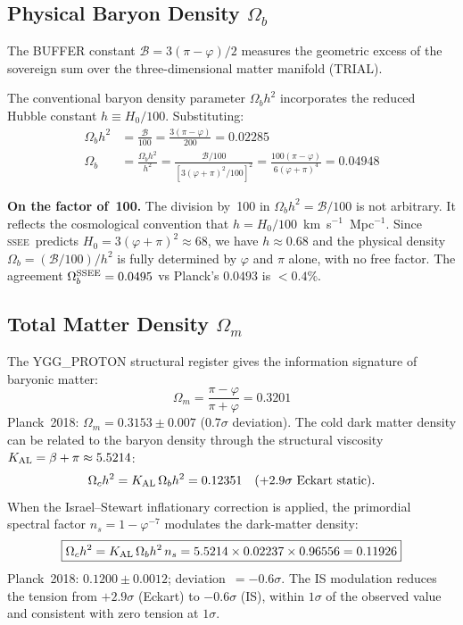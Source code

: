 \documentclass[12pt,a4paper]{article}
\newcommand{\SSEE}{\ifmmode\mathrm{SSEE}\else\textsc{ssee}\fi}
\begin{document}
\subsection{Physical Baryon Density \texorpdfstring{$\Omega_b$}{Omega\_b}}
\label{sec:baryons}

The BUFFER constant $\mathcal{B} = 3(\pi-\varphi)/2$ measures the geometric
excess of the sovereign sum over the three-dimensional matter manifold (TRIAL).

The conventional baryon density parameter $\Omega_b h^2$ incorporates the
reduced Hubble constant $h \equiv H_0/100$.  Substituting:
\begin{align}
\Omega_b h^2 &= \frac{\mathcal{B}}{100} = \frac{3(\pi-\varphi)}{200} = 0.02285 \\[4pt]
\Omega_b     &= \frac{\Omega_b h^2}{h^2}
              = \frac{\mathcal{B}/100}{[3(\varphi+\pi)^2/100]^2}
              = \frac{100(\pi-\varphi)}{6(\varphi+\pi)^4}
              = 0.04948
\label{eq:Ob}
\end{align}

\textbf{On the factor of~100.}
The division by~100 in $\Omega_b h^2 = \mathcal{B}/100$ is not arbitrary.
It reflects the cosmological convention that $h = H_0/100$~km~s$^{-1}$~Mpc$^{-1}$.
Since \SSEE\ predicts $H_0 = 3(\varphi+\pi)^2 \approx 68$, we have $h \approx 0.68$
and the physical density $\Omega_b = (\mathcal{B}/100)/h^2$ is fully determined by
$\varphi$ and $\pi$ alone, with no free factor.
The agreement $\Omega_b^{\rm SSEE} = 0.0495$ vs Planck's $0.0493$ is $<0.4\%$.

\subsection{Total Matter Density \texorpdfstring{$\Omega_m$}{Omega\_m}}
\label{sec:matter}

The YGG\_PROTON structural register gives the information signature of baryonic matter:
\begin{equation}
\Omega_m = \frac{\pi-\varphi}{\pi+\varphi} = 0.3201
\end{equation}
Planck~2018: $\Omega_m = 0.3153\pm0.007$ ($0.7\sigma$ deviation).
The cold dark matter density can be related to the baryon density through the
structural viscosity $K_{\rm AL} = \beta + \pi \approx 5.5214$:
\begin{equation}
\Omega_c h^2 = K_{\rm AL}\,\Omega_b h^2 = 0.12351 \quad (+2.9\sigma\text{ Eckart static}).
\label{eq:omch2_static}
\end{equation}
When the Israel--Stewart inflationary correction is applied, the primordial spectral
factor $n_s = 1-\varphi^{-7}$ modulates the dark-matter density:
\begin{equation}
\boxed{\Omega_c h^2 = K_{\rm AL}\,\Omega_b h^2\,n_s
      = 5.5214\times 0.02237\times 0.96556 = 0.11926}
\label{eq:omch2_IS}
\end{equation}
Planck~2018: $0.1200\pm0.0012$; deviation~$= -0.6\sigma$.
The IS modulation reduces the tension from $+2.9\sigma$ (Eckart) to $-0.6\sigma$ (IS),
within $1\sigma$ of the observed value and consistent with zero tension at $1\sigma$.
\end{document}
